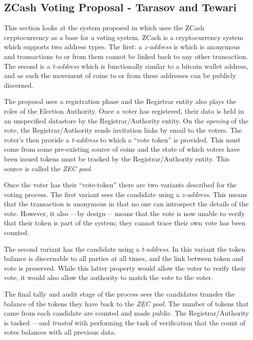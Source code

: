 \subsection{ZCash Voting Proposal - Tarasov and Tewari}

This section looks at the system proposed in \cite{tarasovInternetVotingUsing2017} which uses the ZCash cryptocurrency as a base for a voting system. ZCash is a cryptocurrency system which supports two address types. The first: a \emph{z-address} is which is anonymous and transactions to or from them cannot be linked back to any other transaction. The second is a \emph{t-address} which is functionally similar to a bitcoin wallet address, and as such the movement of coins to or from these addresses can be publicly discerned.

The proposal uses a registration phase and the Registrar entity also plays the roles of the Election Authority. Once a voter has registered, their data is held in an unspecified datastore by the Registrar/Authority entity. On the \emph{opening} of the vote, the Registrar/Authority sends invitation links by email to the voters. The voter's then provide a \emph{t-address} to which a ``vote token'' is provided. This must come from some pre-existing source of coins and the state of which voters have been issued tokens must be tracked by the Registrar/Authority entity. This source is called the \emph{ZEC pool}.

Once the voter has their ``vote-token'' there are two variants described for the voting process.  The first variant sees the candidate using a \emph{z-address}. This means that the transaction is anonymous in that no one can introspect the details of the vote. However, it also ---by design--- means that the vote is now unable to verify that their token is part of the system; they cannot trace their own vote has been counted.

The second variant has the candidate using a \emph{t-address}. In this variant the token balance is discernable to all parties at all times, and the link between token and vote is preserved. While this latter property would allow the voter to verify their vote, it would also allow the authority to match the vote to the voter.

The final tally and audit stage of the process sees the candidates transfer the balance of the tokens they have back to the \emph{ZEC pool}. The number of tokens that came from each candidate are counted and made public. The Registrar/Authority is tasked ---and \emph{trusted} with performing the task of verification that the count of votes balances with all previous data.


